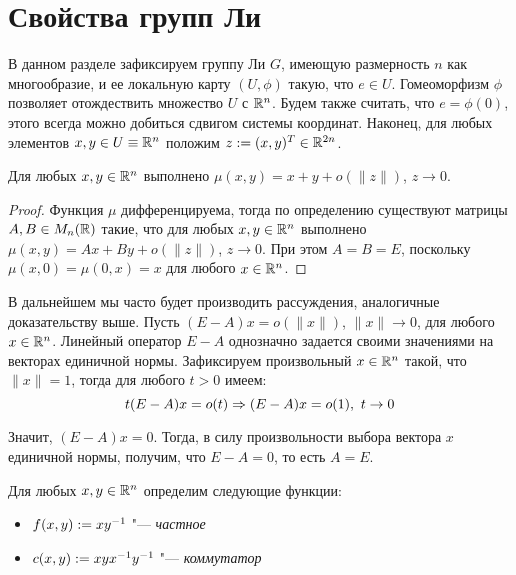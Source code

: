 \section{Свойства групп Ли}

\begin{note}
	В данном разделе зафиксируем группу Ли $G$, имеющую размерность $n$ как многообразие, и ее локальную карту $(U, \phi)$ такую, что $e \in U$. Гомеоморфизм $\phi$ позволяет отождествить множество $U$ с $\mathbb{R}^n$. Будем также считать, что $e = \phi(0)$, этого всегда можно добиться сдвигом системы координат. Наконец, для любых элементов $x, y \in U \equiv \mathbb{R}^n$ положим $z := (x, y)^T \in \mathbb{R}^{2n}$.
\end{note}

\begin{proposition}
	Для любых $x, y \in \mathbb{R}^n$ выполнено $\mu(x, y) = x + y + o(\|z\|)$, $z \to 0$.
\end{proposition}

\begin{proof}
	Функция $\mu$ дифференцируема, тогда по определению существуют матрицы $A, B \in M_n(\mathbb{R})$ такие, что для любых $x, y \in \mathbb{R}^n$ выполнено $\mu(x, y) = Ax + By + o(\|z\|)$, $z \to 0$. При этом $A = B = E$, поскольку $\mu(x, 0) = \mu (0, x) = x$ для любого $x \in \mathbb{R}^n$.
\end{proof}

\begin{note}
	В дальнейшем мы часто будет производить рассуждения, аналогичные доказательству выше. Пусть $(E - A)x = o(\|x\|)$, $\|x\| \to 0$, для любого $x \in \mathbb{R}^n$. Линейный оператор $E - A$ однозначно задается своими значениями на векторах единичной нормы. Зафиксируем произвольный $x \in \mathbb{R}^n$ такой, что $\|x\| = 1$, тогда для любого $t > 0$ имеем:
	\[t(E - A)x = o(t) \Rightarrow (E - A)x = o(1),~t \to 0\]
	
	Значит, $(E - A)x = 0$. Тогда, в силу произвольности выбора вектора $x$ единичной нормы, получим, что $E - A = 0$, то есть $A = E$.
\end{note}

\begin{definition}
	Для любых $x, y \in \mathbb{R}^n$ определим следующие функции:
	\begin{itemize}
		\item $f(x, y) := xy^{-1}$ "--- \textit{частное}
		\item $c(x, y) := xyx^{-1}y^{-1}$ "--- \textit{коммутатор}
	\end{itemize}
\end{definition}

